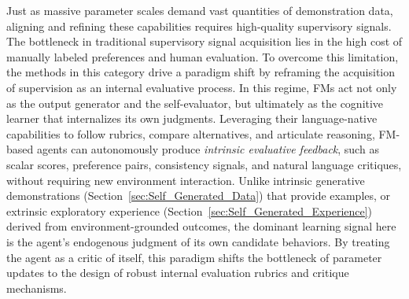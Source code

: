 Just as massive parameter scales demand vast quantities of demonstration data, aligning and refining these capabilities requires high-quality supervisory signals. The bottleneck in traditional supervisory signal acquisition lies in the high cost of manually labeled preferences and human evaluation. To overcome this limitation, the methods in this category drive a paradigm shift by reframing the acquisition of supervision as an internal evaluative process. In this regime, FMs act not only as the output generator and the self-evaluator, but ultimately as the cognitive learner that internalizes its own judgments. Leveraging their language-native capabilities to follow rubrics, compare alternatives, and articulate reasoning, FM-based agents can autonomously produce \textit{intrinsic evaluative feedback}, such as scalar scores, preference pairs, consistency signals, and natural language critiques, without requiring new environment interaction. Unlike intrinsic generative demonstrations (Section~\ref{sec:Self_Generated_Data}) that provide examples, or extrinsic exploratory experience (Section~\ref{sec:Self_Generated_Experience}) derived from environment-grounded outcomes, the dominant learning signal here is the agent's endogenous judgment of its own candidate behaviors. By treating the agent as a critic of itself, this paradigm shifts the bottleneck of parameter updates to the design of robust internal evaluation rubrics and critique mechanisms.


